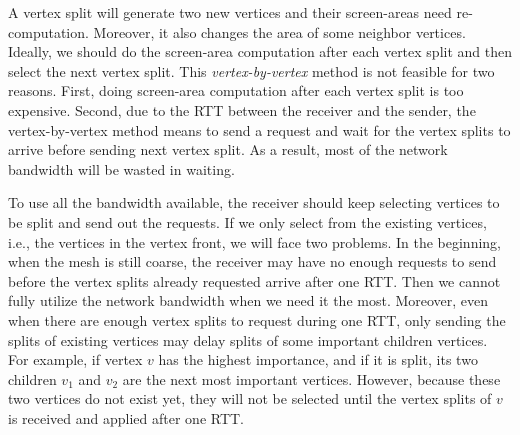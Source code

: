     A vertex split will generate two new vertices and their screen-areas need re-computation.
    Moreover, it also changes the area of some neighbor vertices. Ideally, we should 
    do the screen-area computation after each vertex split and then select the next 
    vertex split. This \emph{vertex-by-vertex} method is not feasible for two reasons.
    First, doing screen-area computation after each vertex split is too expensive. Second,
    due to the RTT between the receiver and the sender, the vertex-by-vertex method means
    to send a request and wait for the vertex splits to arrive before sending next vertex
    split. As a result, most of the network bandwidth will be wasted in waiting. 
    
    To use all the bandwidth available, the receiver should keep selecting vertices to be split
    and send out the requests. If we only select from the existing vertices, i.e.,
    the vertices in the vertex front, we will face two problems.
    In the beginning, when the mesh is still coarse, the receiver may have no enough requests
    to send before the vertex splits already requested arrive after one RTT. 
    Then we cannot fully utilize the network bandwidth when we need it the most.
    Moreover, even when there are enough vertex splits to request during one RTT, only sending
    the splits of existing vertices may delay splits of some important children vertices.
    For example, if vertex $v$ has the highest importance, and if it is split, its two 
    children $v_1$ and $v_2$ are the next most important vertices. However, because these
    two vertices do not exist yet, they will not be selected until the vertex splits of $v$ 
    is received and applied after one RTT.

